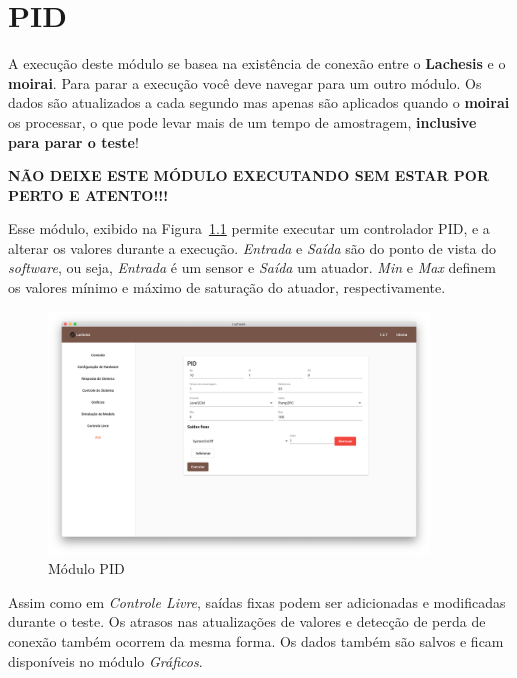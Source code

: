 
\chapter{PID}%
\label{chapter:pid}

\begin{mdframed}[frametitle={Atenção!}]
    A execução deste módulo se basea na existência de conexão entre o
    \textbf{Lachesis} e o \textbf{moirai}. Para parar a execução você deve
    navegar para um outro módulo. Os dados são atualizados a cada segundo mas
    apenas são aplicados quando o \textbf{moirai} os processar, o que pode levar
    mais de um tempo de amostragem, \textbf{inclusive para parar o teste}!

    \textbf{NÃO DEIXE ESTE MÓDULO EXECUTANDO SEM ESTAR POR PERTO E ATENTO!!!}
\end{mdframed}

Esse módulo, exibido na Figura~\ref{fig:pid} permite executar um controlador
PID, e a alterar os valores durante a execução. \textit{Entrada} e
\textit{Saída} são do ponto de vista do \textit{software}, ou seja,
\textit{Entrada} é um sensor e \textit{Saída} um atuador. \textit{Min} e
\textit{Max} definem os valores mínimo e máximo de saturação do atuador,
respectivamente.

\begin{figure}[ht!]
    \centering
    \includegraphics[width=0.9\textwidth]{imgs/pid}
    \caption[Módulo PID]{Módulo PID}%
    \label{fig:pid}
\end{figure}

Assim como em \textit{Controle Livre}, saídas fixas podem ser adicionadas e
modificadas durante o teste. Os atrasos nas atualizações de valores e detecção
de perda de conexão também ocorrem da mesma forma. Os dados também são salvos e
ficam disponíveis no módulo \textit{Gráficos}.
